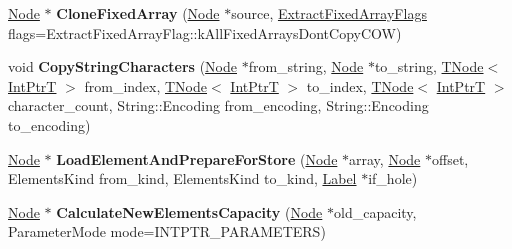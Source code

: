 \begin{DoxyCompactItemize}
\item 
\mbox{\label{classv8_1_1internal_1_1CodeStubAssembler_a95c99517b532238003ae8fea575b8b32}} 
\mbox{\hyperlink{classv8_1_1internal_1_1compiler_1_1Node}{Node}} $\ast$ {\bfseries Clone\+Fixed\+Array} (\mbox{\hyperlink{classv8_1_1internal_1_1compiler_1_1Node}{Node}} $\ast$source, \mbox{\hyperlink{classv8_1_1base_1_1Flags}{Extract\+Fixed\+Array\+Flags}} flags=Extract\+Fixed\+Array\+Flag\+::k\+All\+Fixed\+Arrays\+Dont\+Copy\+C\+OW)
\item 
\mbox{\label{classv8_1_1internal_1_1CodeStubAssembler_a4c83b7c9d42e2ae449edec026379c892}} 
void {\bfseries Copy\+String\+Characters} (\mbox{\hyperlink{classv8_1_1internal_1_1compiler_1_1Node}{Node}} $\ast$from\+\_\+string, \mbox{\hyperlink{classv8_1_1internal_1_1compiler_1_1Node}{Node}} $\ast$to\+\_\+string, \mbox{\hyperlink{classv8_1_1internal_1_1compiler_1_1TNode}{T\+Node}}$<$ \mbox{\hyperlink{structv8_1_1internal_1_1IntPtrT}{Int\+PtrT}} $>$ from\+\_\+index, \mbox{\hyperlink{classv8_1_1internal_1_1compiler_1_1TNode}{T\+Node}}$<$ \mbox{\hyperlink{structv8_1_1internal_1_1IntPtrT}{Int\+PtrT}} $>$ to\+\_\+index, \mbox{\hyperlink{classv8_1_1internal_1_1compiler_1_1TNode}{T\+Node}}$<$ \mbox{\hyperlink{structv8_1_1internal_1_1IntPtrT}{Int\+PtrT}} $>$ character\+\_\+count, String\+::\+Encoding from\+\_\+encoding, String\+::\+Encoding to\+\_\+encoding)
\item 
\mbox{\label{classv8_1_1internal_1_1CodeStubAssembler_a23ef784e317ff1a483d4a04b1fa233a5}} 
\mbox{\hyperlink{classv8_1_1internal_1_1compiler_1_1Node}{Node}} $\ast$ {\bfseries Load\+Element\+And\+Prepare\+For\+Store} (\mbox{\hyperlink{classv8_1_1internal_1_1compiler_1_1Node}{Node}} $\ast$array, \mbox{\hyperlink{classv8_1_1internal_1_1compiler_1_1Node}{Node}} $\ast$offset, Elements\+Kind from\+\_\+kind, Elements\+Kind to\+\_\+kind, \mbox{\hyperlink{classv8_1_1internal_1_1compiler_1_1CodeAssemblerLabel}{Label}} $\ast$if\+\_\+hole)
\item 
\mbox{\label{classv8_1_1internal_1_1CodeStubAssembler_afad63a4971fe7f1b900dbe70c50f9d15}} 
\mbox{\hyperlink{classv8_1_1internal_1_1compiler_1_1Node}{Node}} $\ast$ {\bfseries Calculate\+New\+Elements\+Capacity} (\mbox{\hyperlink{classv8_1_1internal_1_1compiler_1_1Node}{Node}} $\ast$old\+\_\+capacity, Parameter\+Mode mode=I\+N\+T\+P\+T\+R\+\_\+\+P\+A\+R\+A\+M\+E\+T\+E\+RS)

\end{DoxyCompactItemize}
